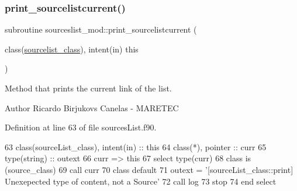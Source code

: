 \subsubsection{\texorpdfstring{print\+\_\+sourcelistcurrent()}{print\_sourcelistcurrent()}}
{\footnotesize\ttfamily subroutine sourceslist\+\_\+mod\+::print\+\_\+sourcelistcurrent (\begin{DoxyParamCaption}\item[{class(\mbox{\hyperlink{structsourceslist__mod_1_1sourcelist__class}{sourcelist\+\_\+class}}), intent(in)}]{this }\end{DoxyParamCaption})\hspace{0.3cm}{\ttfamily [private]}}



Method that prints the current link of the list. 

\begin{DoxyAuthor}{Author}
Ricardo Birjukovs Canelas -\/ M\+A\+R\+E\+T\+EC 
\end{DoxyAuthor}


Definition at line 63 of file sources\+List.\+f90.


\begin{DoxyCode}
63     \textcolor{keywordtype}{class}(sourceList\_class), \textcolor{keywordtype}{intent(in)} :: this
64     \textcolor{keywordtype}{class}(*), \textcolor{keywordtype}{pointer} :: curr
65     \textcolor{keywordtype}{type}(string) :: outext
66     curr => this%
67     \textcolor{keywordflow}{select type}(curr)
68 \textcolor{keywordflow}{    class is} (source\_class)
69         \textcolor{keyword}{call }curr%
70 \textcolor{keywordflow}{        class default}
71         outext = \textcolor{stringliteral}{'[sourceList\_class::print] Unexepected type of content, not a Source'}
72         \textcolor{keyword}{call }log%
73         stop
74 \textcolor{keywordflow}{    end select}
\end{DoxyCode}
